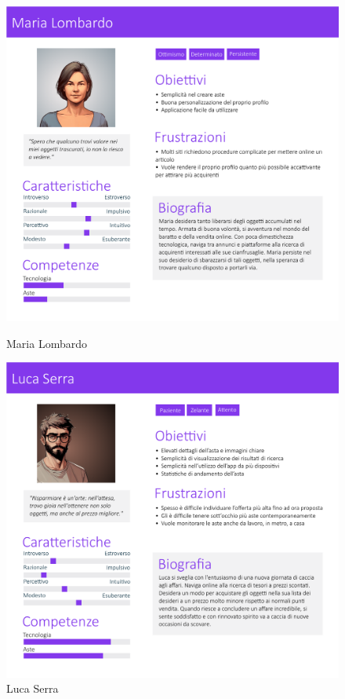         \begin{figure}[!htb]
           \begin{minipage}{0.48\textwidth}
                \centering
             \includegraphics[width=.7\linewidth]{Immagini/Personas/Maria Lombardo.pdf}
             \caption{Maria Lombardo}\label{Fig:Maria Lombardo}
           \end{minipage}\hfill
           \begin{minipage}{0.48\textwidth}
                \centering
             \includegraphics[width=.7\linewidth]{Immagini/Personas/Luca Serra.pdf}
             \caption{Luca Serra}\label{Fig:Luca Serra}
           \end{minipage}
        \end{figure}


